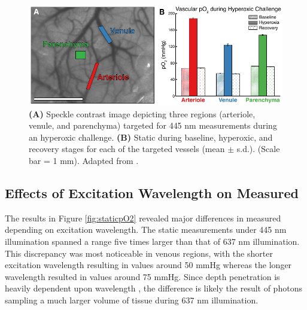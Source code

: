 \begin{figure}
    \includegraphics{figures/chapter_2/hyperoxicchallenge.pdf}
    \caption[\textbf{(A)} Speckle contrast image depicting three regions (arteriole, venule, and parenchyma) targeted for 445 nm  measurements during an hyperoxic challenge. \textbf{(B)} Static  during baseline, hyperoxic, and recovery stages for each of the targeted vessels (mean $\pm$ s.d.). (Scale bar = 1 mm).]{
        \label{fig:hyperoxicchallenge}
        \textbf{(A)} Speckle contrast image depicting three regions (arteriole, venule, and parenchyma) targeted for 445 nm  measurements during an hyperoxic challenge. \textbf{(B)} Static  during baseline, hyperoxic, and recovery stages for each of the targeted vessels (mean $\pm$ s.d.). (Scale bar = 1 mm). Adapted from \cite{Sullender:2018ff}.
    }
\end{figure}

\subsection{Effects of Excitation Wavelength on Measured }

The results in Figure \ref{fig:staticpO2} revealed major differences in measured  depending on excitation wavelength. The static  measurements under 445 nm illumination spanned a range five times larger than that of 637 nm illumination. This discrepancy was most noticeable in venous regions, with the shorter excitation wavelength resulting in  values around 50 mmHg whereas the longer wavelength resulted in values around 75 mmHg. Since depth penetration is heavily dependent upon wavelength \cite{Deng:2003kb}, the difference is likely the result of photons sampling a much larger volume of tissue during 637 nm illumination.

